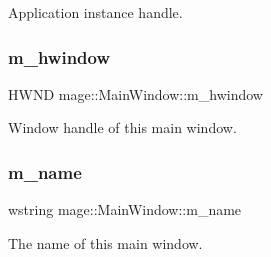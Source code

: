 Application instance handle. \hypertarget{classmage_1_1_main_window_afc9afabcf8a52d79f02c8352451863cc}{}\label{classmage_1_1_main_window_afc9afabcf8a52d79f02c8352451863cc} 
\subsubsection{\texorpdfstring{m\+\_\+hwindow}{m\_hwindow}}
{\footnotesize\ttfamily H\+W\+ND mage\+::\+Main\+Window\+::m\+\_\+hwindow\hspace{0.3cm}{\ttfamily [protected]}}

Window handle of this main window. \hypertarget{classmage_1_1_main_window_a23d4e1b9499ab540b205af237710d783}{}\label{classmage_1_1_main_window_a23d4e1b9499ab540b205af237710d783} 
\subsubsection{\texorpdfstring{m\+\_\+name}{m\_name}}
{\footnotesize\ttfamily wstring mage\+::\+Main\+Window\+::m\+\_\+name\hspace{0.3cm}{\ttfamily [protected]}}

The name of this main window. 